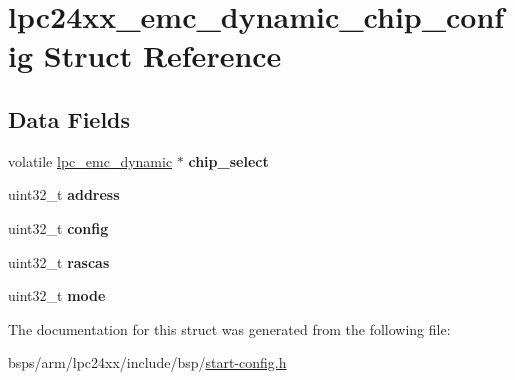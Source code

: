 \hypertarget{structlpc24xx__emc__dynamic__chip__config}{}\section{lpc24xx\+\_\+emc\+\_\+dynamic\+\_\+chip\+\_\+config Struct Reference}
\label{structlpc24xx__emc__dynamic__chip__config}
\subsection*{Data Fields}
\begin{DoxyCompactItemize}
\item 
\mbox{\label{structlpc24xx__emc__dynamic__chip__config_a953fcb1a3176e4d1a06283547844672b}} 
volatile \mbox{\hyperlink{structlpc__emc__dynamic}{lpc\+\_\+emc\+\_\+dynamic}} $\ast$ {\bfseries chip\+\_\+select}
\item 
\mbox{\label{structlpc24xx__emc__dynamic__chip__config_a8cf34fefa25376a722beca3508962f83}} 
uint32\+\_\+t {\bfseries address}
\item 
\mbox{\label{structlpc24xx__emc__dynamic__chip__config_a701fb7cdfddbc0d6c162aa8fb8b15f5b}} 
uint32\+\_\+t {\bfseries config}
\item 
\mbox{\label{structlpc24xx__emc__dynamic__chip__config_aa988aca1cd7902099496c4bcd48f30ab}} 
uint32\+\_\+t {\bfseries rascas}
\item 
\mbox{\label{structlpc24xx__emc__dynamic__chip__config_a1667a8f5d14fe8a70eebc7addf5c2e7b}} 
uint32\+\_\+t {\bfseries mode}
\end{DoxyCompactItemize}


The documentation for this struct was generated from the following file\+:\begin{DoxyCompactItemize}
\item 
bsps/arm/lpc24xx/include/bsp/\mbox{\hyperlink{start-config_8h}{start-\/config.\+h}}\end{DoxyCompactItemize}

